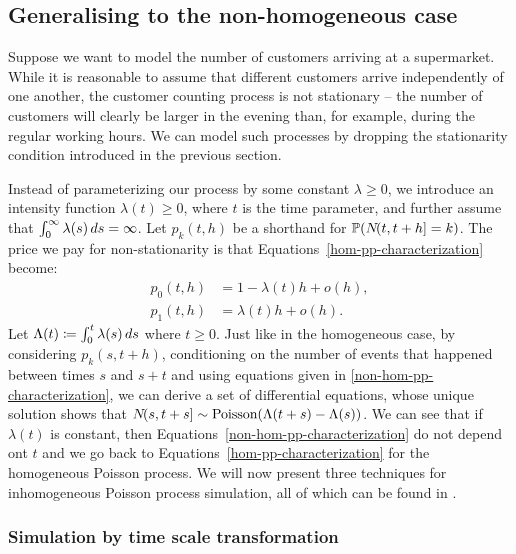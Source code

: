 \documentclass[report.tex]{subfiles}
\begin{document}
\subsection{Generalising to the non-homogeneous case}
\label{non-hom-pp-background}

Suppose we want to model the number of customers arriving at a supermarket.
While it is reasonable to assume that different customers arrive independently
of one another, the customer counting process is not stationary -- the number
of customers will clearly be larger in the evening than, for example, during
the regular working hours.
We can model such processes by dropping the stationarity condition introduced
in the previous section.

Instead of parameterizing our process by some constant $\lambda \geq 0$, we introduce
an intensity function $\lambda(t) \geq 0$, where $t$ is the time parameter, and
further assume that $\int_{{0}}^{{\infty}} {\lambda(s)}\, d{s} = \infty$.
Let $p_{k}(t, h)$ be a shorthand for $\mathbb{P}\!\left({{N}\!({t},{t+h}] = k}\right)$.
The price we pay for non-stationarity is that Equations~\ref{hom-pp-characterization}
become:
\begin{equation}
\begin{split}
  \label{non-hom-pp-characterization}
  p_{0}(t, h) &= 1 - \lambda(t) h + o(h), \\
  p_{1}(t, h) &= \lambda(t) h + o(h).
\end{split}
\end{equation}
Let $\Lambda(t) \coloneqq \int_{{0}}^{{t}} {\lambda(s)}\, d{s}$ where $t \geq 0$.
Just like in the homogeneous case, by considering $p_{k}(s, t + h)$,
conditioning on the number of events that happened between times $s$ and $s + t$
and using equations given in \ref{non-hom-pp-characterization},
we can derive a set of differential equations, whose unique solution shows that
${N}\!({s},{t+s}] \sim \text{Poisson}(\Lambda(t+s) - \Lambda(s))$.
We can see that if $\lambda(t)$ is constant, then Equations~\ref{non-hom-pp-characterization}
do not depend ont $t$ and we go back to Equations~\ref{hom-pp-characterization}
for the homogeneous Poisson process.
We will now present three techniques for inhomogeneous Poisson process simulation,
all of which can be found in \citet{devroye2013non}.

\subsubsection{Simulation by time scale transformation}
\end{document}
